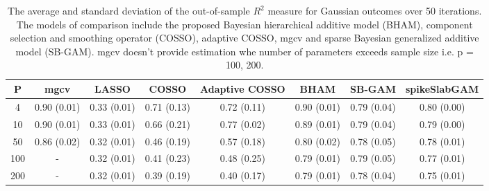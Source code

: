\begin{table}[ht]
\centering
\begin{tabular}{cccccccc}
  \hline
P & mgcv & LASSO & COSSO & Adaptive COSSO & BHAM & SB-GAM & spikeSlabGAM \\ 
  \hline
  4 & 0.90 (0.01) & 0.33 (0.01) & 0.71 (0.13) & 0.72 (0.11) & 0.90 (0.01) & 0.79 (0.04) & 0.80 (0.00) \\ 
   10 & 0.90 (0.01) & 0.33 (0.01) & 0.66 (0.21) & 0.77 (0.02) & 0.89 (0.01) & 0.79 (0.04) & 0.79 (0.00) \\ 
   50 & 0.86 (0.02) & 0.32 (0.01) & 0.46 (0.19) & 0.57 (0.18) & 0.80 (0.02) & 0.78 (0.05) & 0.78 (0.01) \\ 
  100 & - & 0.32 (0.01) & 0.41 (0.23) & 0.48 (0.25) & 0.79 (0.01) & 0.79 (0.05) & 0.77 (0.01) \\ 
  200 & - & 0.32 (0.01) & 0.39 (0.19) & 0.40 (0.17) & 0.79 (0.01) & 0.78 (0.04) & 0.75 (0.01) \\ 
   \hline
\end{tabular}
\caption{The average and standard deviation of the out-of-sample $R^2$ measure for
    Gaussian outcomes over 50 iterations. The models of comparison include the proposed Bayesian
    hierarchical additive model (BHAM), component selection and smoothing operator (COSSO), adaptive
    COSSO, mgcv and sparse Bayesian generalized additive model (SB-GAM). mgcv doesn't provide estimation
    whe number of parameters exceeds sample size i.e. p = 100, 200.} 
\label{tab:gaus}
\end{table}
